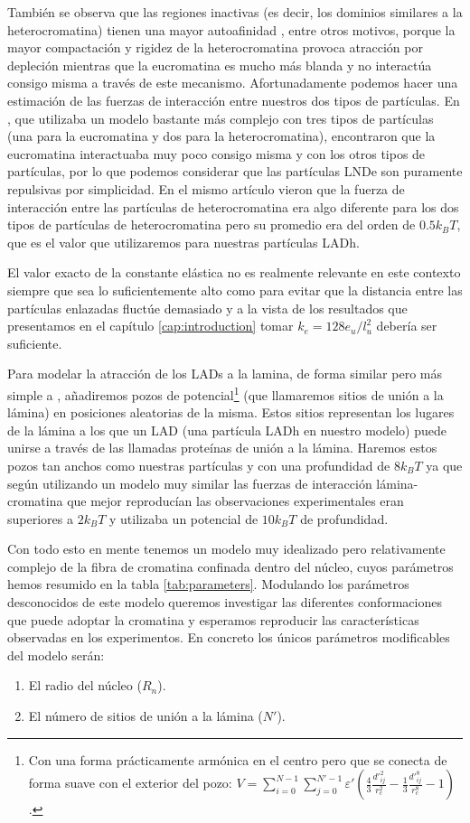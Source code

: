 También se observa que las regiones inactivas (es decir, los dominios similares a la heterocromatina) tienen una mayor autoafinidad \cite{Camara2023}, entre otros motivos, porque la mayor compactación y rigidez de la heterocromatina provoca atracción por depleción mientras que la eucromatina es mucho más blanda y no interactúa consigo misma a través de este mecanismo. Afortunadamente podemos hacer una estimación de las fuerzas de interacción entre nuestros dos tipos de partículas. En \cite{Falk2019}, que utilizaba un modelo bastante más complejo con tres tipos de partículas (una para la eucromatina y dos para la heterocromatina), encontraron que la eucromatina interactuaba muy poco consigo misma y con los otros tipos de partículas, por lo que podemos considerar que las partículas LNDe son puramente repulsivas por simplicidad. En el mismo artículo vieron que la fuerza de interacción entre las partículas de heterocromatina era algo diferente para los dos tipos de partículas de heterocromatina pero su promedio era del orden de $0.5k_BT$, que es el valor que utilizaremos para nuestras partículas LADh.

El valor exacto de la constante elástica no es realmente relevante en este contexto siempre que sea lo suficientemente alto como para evitar que la distancia entre las partículas enlazadas fluctúe demasiado y a la vista de los resultados que presentamos en el capítulo \ref{cap:introduction} tomar $k_e=128e_u/l_u^2$ debería ser suficiente.

Para modelar la atracción de los LADs a la lamina, de forma similar pero más simple a \cite{Bajpai2021}, añadiremos pozos de potencial\footnote{Con una forma prácticamente armónica en el centro pero que se conecta de forma suave con el exterior del pozo: $V=\sum_{i=0}^{N-1}\sum_{j=0}^{N'-1}\varepsilon'\left(\frac{4}{3}\frac{{d'}_{ij}^{2}}{r_c^{2}}-\frac{1}{3}\frac{{d'}_{ij}^{8}}{r_c^{8}}-1\right)$.} (que llamaremos sitios de unión a la lámina) en posiciones aleatorias de la misma. Estos sitios representan los lugares de la lámina a los que un LAD (una partícula LADh en nuestro modelo) puede unirse a través de las llamadas proteínas de unión a la lámina. Haremos estos pozos tan anchos como nuestras partículas y con una profundidad de $8k_BT$ ya que según \cite{Maji2020} utilizando un modelo muy similar las fuerzas de interacción lámina-cromatina que mejor reproducían las observaciones experimentales eran superiores a $2k_BT$ y \cite{Bajpai2021} utilizaba un potencial de $10k_BT$ de profundidad.

Con todo esto en mente tenemos un modelo muy idealizado pero relativamente complejo de la fibra de cromatina confinada dentro del núcleo, cuyos parámetros hemos resumido en la tabla \ref{tab:parameters}. Modulando los parámetros desconocidos de este modelo queremos investigar las diferentes conformaciones que puede adoptar la cromatina y esperamos reproducir las características observadas en los experimentos. En concreto los únicos parámetros modificables del modelo serán:
\begin{enumerate}
    \item El radio del núcleo ($R_n$).
    \item El número de sitios de unión a la lámina ($N'$).
\end{enumerate}

